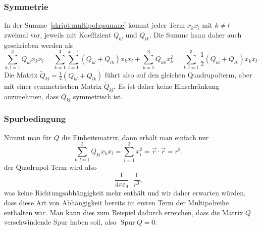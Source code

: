 \subsubsection{Symmetrie}
In der Summe~\eqref{skript:multipol:qsumme} kommt jeder Term
$x_kx_l$ mit $k\ne l$ zweimal vor, jeweils mit Koeffizient $Q_{kl}$
und $Q_{lk}$.
Die Summe kann daher auch geschrieben werden als
\[
\sum_{k,l=1}^3 Q_{kl}x_kx_l
=
\sum_{k=1}^3 \sum_{l=1}^{k-1} (Q_{kl}+Q_{lk})x_kx_l
+
\sum_{k=1}^3 Q_{kk}x_k^2
=
\sum_{k,l=1}^3 \frac12(Q_{kl}+Q_{lk}) x_kx_l.
\]
Die Matrix $\tilde Q_{kl}=\frac12(Q_{kl}+Q_{lk})$ führt also auf den
gleichen Quadrupolterm, aber mit einer symmetrischen Matrix $\tilde Q_{kl}$.
Es ist daher keine Einschränkung anzunehmen, dass $Q_{kl}$ symmetrisch ist.

\subsubsection{Spurbedingung}
Nimmt man für $Q$ die Einheitsmatrix, dann erhält man einfach nur
\[
\sum_{k,l=1}^3 Q_{kl}x_kx_l=\sum_{i=1}^3 x_i^2 = \vec{r}\cdot\vec{r}=r^2,
\]
der Quadrupol-Term wird also 
\[
\frac1{4\pi\varepsilon_0}\cdot\frac{1}{r^3},
\]
was keine Richtungsabhängigkeit mehr enthält und wir daher erwarten
würden, dass diese Art von Abhängigkeit bereits im ersten Term 
der Multipolreihe enthalten war.
Man kann dies zum Beispiel dadurch erreichen, dass die Matrix $Q$ 
verschwindende Spur haben soll, also $\operatorname{Spur}Q=0$.

